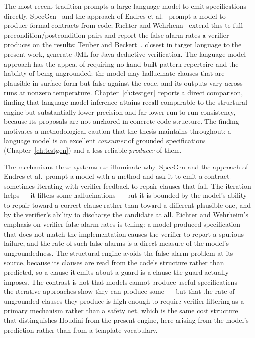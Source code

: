 The most recent tradition prompts a large language model to emit
specifications directly. SpecGen~\cite{ma2024specgen} and the approach of
Endres et al.~\cite{endres2024can} prompt a model to produce formal contracts
from code; Richter and Wehrheim~\cite{richter2025beyondpostconditions} extend
this to full precondition/postcondition pairs and report the false-alarm rates
a verifier produces on the results; Teuber and
Beckert~\cite{teuber2025nextsteps}, closest in target language to the present
work, generate JML for Java deductive verification. The language-model
approach has the appeal of requiring no hand-built pattern repertoire and the
liability of being ungrounded: the model may hallucinate clauses that are
plausible in surface form but false against the code, and its outputs vary
across runs at nonzero temperature. Chapter~\ref{ch:testgen} reports a direct
comparison, finding that language-model inference attains recall comparable to
the structural engine but substantially lower precision and far lower
run-to-run consistency, because its proposals are not anchored in concrete
code structure. The finding motivates a methodological caution that the thesis
maintains throughout: a language model is an excellent \emph{consumer} of
grounded specifications (Chapter~\ref{ch:testgen}) and a less reliable
\emph{producer} of them.

The mechanisms these systems use illuminate why. SpecGen and the approach of
Endres et al.\ prompt a model with a method and ask it to emit a contract,
sometimes iterating with verifier feedback to repair clauses that fail. The
iteration helps --- it filters some hallucinations --- but it is bounded by the
model's ability to repair toward a correct clause rather than toward a different
plausible one, and by the verifier's ability to discharge the candidate at all.
Richter and Wehrheim's emphasis on verifier false-alarm rates is telling: a
model-produced specification that does not match the implementation causes the
verifier to report a spurious failure, and the rate of such false alarms is a
direct measure of the model's ungroundedness. The structural engine avoids the
false-alarm problem at its source, because its clauses are read from the code's
structure rather than predicted, so a clause it emits about a guard is a clause the
guard actually imposes. The contrast is not that models cannot produce useful
specifications --- the iterative approaches show they can produce some --- but that
the rate of ungrounded clauses they produce is high enough to require verifier
filtering as a primary mechanism rather than a safety net, which is the same cost
structure that distinguishes Houdini from the present engine, here arising from the
model's prediction rather than from a template vocabulary.

